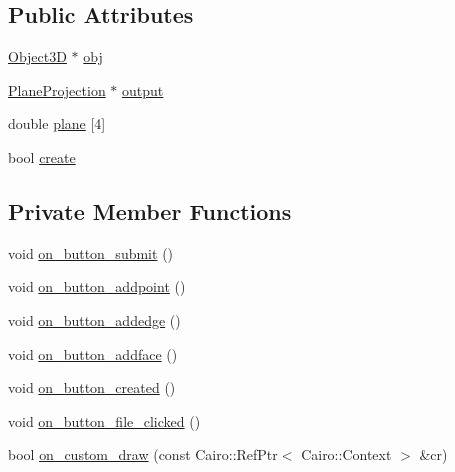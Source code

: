 \subsection*{Public Attributes}
\begin{DoxyCompactItemize}
\item 
\hyperlink{class_object3_d}{Object3D} $\ast$ \hyperlink{class_projection_window_a293d88f62f3e1bfaae618efb908d558f}{obj}
\item 
\hyperlink{class_plane_projection}{Plane\+Projection} $\ast$ \hyperlink{class_projection_window_ab0d78b724ab9b44c72f02de7980091ae}{output}
\item 
double \hyperlink{class_projection_window_aa130209ff4f537cab083939abe684bc4}{plane} \mbox{[}4\mbox{]}
\item 
bool \hyperlink{class_projection_window_a9d2ad475176146e8a5e5f846162b2de5}{create}
\end{DoxyCompactItemize}
\subsection*{Private Member Functions}
\begin{DoxyCompactItemize}
\item 
void \hyperlink{class_projection_window_a63deb52bcb4430a8b69433469a07e86a}{on\+\_\+button\+\_\+submit} ()
\item 
void \hyperlink{class_projection_window_a7c9820a913ddd148340de253f89d597d}{on\+\_\+button\+\_\+addpoint} ()
\item 
void \hyperlink{class_projection_window_acccff48ee21968a09a650530b88b83c7}{on\+\_\+button\+\_\+addedge} ()
\item 
void \hyperlink{class_projection_window_a3205f524a90213beffb9870b8fddd5e7}{on\+\_\+button\+\_\+addface} ()
\item 
void \hyperlink{class_projection_window_a6565002548ab838930bd4fd7b7a8e52e}{on\+\_\+button\+\_\+created} ()
\item 
void \hyperlink{class_projection_window_a78c9c0a2b97f1c2775cac14e2ed22744}{on\+\_\+button\+\_\+file\+\_\+clicked} ()
\item 
bool \hyperlink{class_projection_window_abac0b81445020f55b0bcfaf3a2548492}{on\+\_\+custom\+\_\+draw} (const Cairo\+::\+Ref\+Ptr$<$ Cairo\+::\+Context $>$ \&cr)
\end{DoxyCompactItemize}
